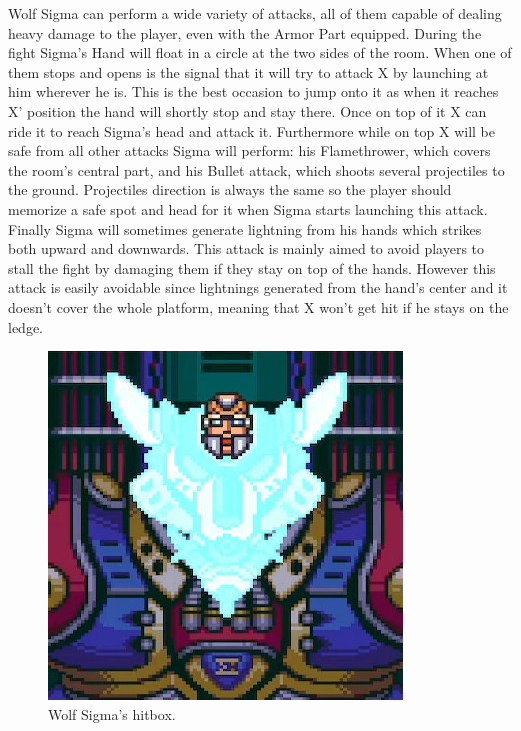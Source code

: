 Wolf Sigma can perform a wide variety of attacks, all of them capable of dealing heavy damage to the player, even with the Armor Part equipped. During the fight Sigma's Hand will float in a circle at the two sides of the room. When one of them stops and opens is the signal that it will try to attack X by launching at him wherever he is. This is the best occasion to jump onto it as when it reaches X' position the hand will shortly stop and stay there. Once on top of it X can ride it to reach Sigma's head and attack it. Furthermore while on top X will be safe from all other attacks Sigma will perform: his Flamethrower, which covers the room's central part, and his Bullet attack, which shoots several projectiles to the ground. Projectiles direction is always the same so the player should memorize a safe spot and head for it when Sigma starts launching this attack. Finally Sigma will sometimes generate lightning from his hands which strikes both upward and downwards. This attack is mainly aimed to avoid players to stall the fight by damaging them if they stay on top of the hands. However this attack is easily avoidable since lightnings generated from the hand's center and it doesn't cover the whole platform, meaning that X won't get hit if he stays on the ledge. 
\begin{figure}[htp]
	\centering		
	\includegraphics[width=0.4\linewidth]{figures/X1/Sigma_stages/WolfSigma_hitbox.jpg}
	\caption{Wolf Sigma's hitbox.}
\end{figure}

